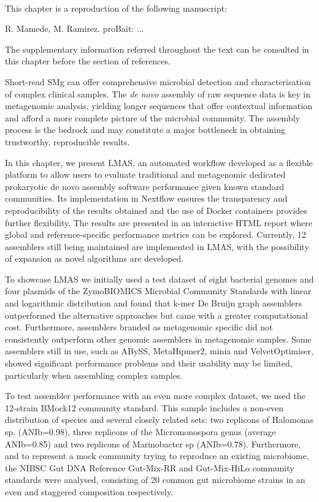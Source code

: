 \mbox{}\\
\vspace{8cm}

This chapter is a reproduction of the following manuscript:

R. Mamede, M. Ramirez. proBait: ...

The supplementary information referred throughout the text can be consulted in this chapter before the section of references.

Short-read \ac{SMg} can offer comprehensive microbial detection and characterisation of complex clinical samples. The \textit{de novo} assembly of raw sequence data is key in metagenomic analysis, yielding longer sequences that offer contextual information and afford a more complete picture of the microbial community. The assembly process is the bedrock and may constitute a major bottleneck in obtaining trustworthy, reproducible results.

In this chapter, we present LMAS, an automated workflow developed as a flexible platform to allow users to evaluate traditional and metagenomic dedicated prokaryotic de novo assembly software performance given known standard communities. Its implementation in Nextflow ensures the transparency and reproducibility of the results obtained and the use of Docker containers provides further flexibility. The results are presented in an interactive HTML report where global and reference-specific performance metrics can be explored. Currently, 12 assemblers still being maintained are implemented in LMAS, with the possibility of expansion as novel algorithms are developed.

To showcase LMAS we initially used a test dataset of eight bacterial genomes and four plasmids of the ZymoBIOMICS Microbial Community Standards with linear and logarithmic distribution and found that k-mer De Bruijn graph assemblers outperformed the alternative approaches but came with a greater computational cost. Furthermore, assemblers branded as metagenomic specific did not consistently outperform other genomic assemblers in metagenomic samples. Some assemblers still in use, such as ABySS, MetaHipmer2, minia and VelvetOptimiser,  showed significant performance problems and their usability may be limited, particularly when assembling complex samples. 

To test assembler performance with an even more complex dataset, we used the 12-strain BMock12 community standard. This sample includes a non-even distribution of species and several closely related sets: two replicons of Halomonas sp. (ANIb=0.98), three replicons of the Micromonospora genus (average ANIb=0.85) and two replicons of Marinobacter sp (ANIb=0.78). Furthermore, and to represent a mock community trying to reproduce an existing microbiome, the NIBSC Gut DNA Reference Gut-Mix-RR and Gut-Mix-HiLo community standards were analysed, consisting of 20 common gut microbiome strains in an even and staggered composition respectively.

